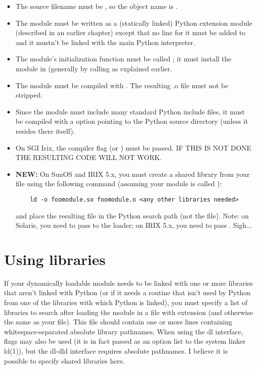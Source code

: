 \begin{itemize}

\item
The source filename must be , so the object
name is .

\item
The module must be written as a (statically linked) Python extension
module (described in an earlier chapter) except that no line for it
must be added to  and it mustn't be linked with the
main Python interpreter.

\item
The module's initialization function must be called ; it
must install the module in  (generally by calling
 as explained earlier.

\item
The module must be compiled with .  The resulting .o file must
not be stripped.

\item
Since the module must include many standard Python include files, it
must be compiled with a  option pointing to the Python source
directory (unless it resides there itself).

\item
On SGI Irix, the compiler flag  (or ) must be passed.
IF THIS IS NOT DONE THE RESULTING CODE WILL NOT WORK.

\item
{\bf NEW:} On SunOS and IRIX 5.x, you must create a shared library
from your  file using the following command (assuming your
module is called ):

\begin{verbatim}
    ld -o foomodule.so foomodule.o <any other libraries needed>
\end{verbatim}

and place the resulting  file in the Python search path (not
the  file).  Note: on Solaris, you need to pass  to
the loader; on IRIX 5.x, you need to pass .  Sigh...

\end{itemize}


\section{Using libraries}

If your dynamically loadable module needs to be linked with one or
more libraries that aren't linked with Python (or if it needs a
routine that isn't used by Python from one of the libraries with which
Python is linked), you must specify a list of libraries to search
after loading the module in a file with extension  (and
otherwise the same as your  file).  This file should contain
one or more lines containing whitespace-separated absolute library
pathnames.  When using the dl interface,  flags may also
be used (it is in fact passed as an option list to the system linker
ld(1)), but the dl-dld interface requires absolute pathnames.  I
believe it is possible to specify shared libraries here.

